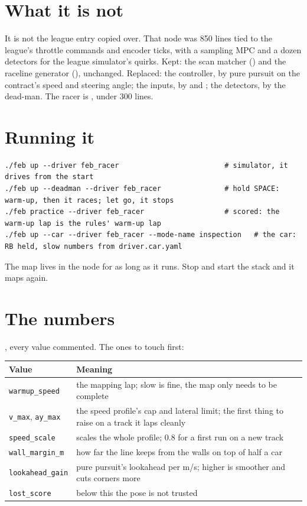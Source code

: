\documentclass[11pt,a4paper]{article}
\begin{document}
\section{What it is not}

It is not the league entry copied over. That node was 850 lines tied to the league's throttle commands and encoder
ticks, with a sampling MPC and a dozen detectors for the league simulator's quirks. Kept: the scan matcher
() and the raceline generator (), unchanged. Replaced: the controller, by
pure pursuit on the contract's speed and steering angle; the inputs, by  and ; the detectors,
by the dead-man. The racer is , under 300 lines.

\section{Running it}

\begin{lstlisting}
./feb up --driver feb_racer                         # simulator, it drives from the start
./feb up --deadman --driver feb_racer               # hold SPACE: warm-up, then it races; let go, it stops
./feb practice --driver feb_racer                   # scored: the warm-up lap is the rules' warm-up lap
./feb up --car --driver feb_racer --mode-name inspection   # the car: RB held, slow numbers from driver.car.yaml
\end{lstlisting}

The map lives in the node for as long as it runs. Stop and start the stack and it maps again.

\section{The numbers}

, every value commented. The ones to touch first:

\begin{tabularx}{\linewidth}{lX}
\toprule
Value & Meaning \\
\midrule
\texttt{warmup\_speed} & the mapping lap; slow is fine, the map only needs to be complete \\
\texttt{v\_max}, \texttt{ay\_max} & the speed profile's cap and lateral limit; the first thing to raise on a track it laps cleanly \\
\texttt{speed\_scale} & scales the whole profile; 0.8 for a first run on a new track \\
\texttt{wall\_margin\_m} & how far the line keeps from the walls on top of half a car \\
\texttt{lookahead\_gain} & pure pursuit's lookahead per m/s; higher is smoother and cuts corners more \\
\texttt{lost\_score} & below this the pose is not trusted \\
\bottomrule
\end{tabularx}
\end{document}
